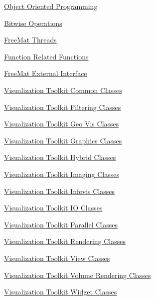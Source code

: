 \begin{DoxyItemize}
\item \hyperlink{sec_class}{Object Oriented Programming}  
\item \hyperlink{sec_binary}{Bitwise Operations}  
\item \hyperlink{sec_thread}{Free\-Mat Threads}  
\item \hyperlink{sec_function}{Function Related Functions}  
\item \hyperlink{sec_external}{Free\-Mat External Interface}  
\item \hyperlink{sec_vtkcommon}{Visualization Toolkit Common Classes}  
\item \hyperlink{sec_vtkfiltering}{Visualization Toolkit Filtering Classes}  
\item \hyperlink{sec_vtkgeovis}{Visualization Toolkit Geo Vis Classes}  
\item \hyperlink{sec_vtkgraphics}{Visualization Toolkit Graphics Classes}  
\item \hyperlink{sec_vtkhybrid}{Visualization Toolkit Hybrid Classes}  
\item \hyperlink{sec_vtkimaging}{Visualization Toolkit Imaging Classes}  
\item \hyperlink{sec_vtkinfovis}{Visualization Toolkit Infovis Classes}  
\item \hyperlink{sec_vtkio}{Visualization Toolkit I\-O Classes}  
\item \hyperlink{sec_vtkparallel}{Visualization Toolkit Parallel Classes}  
\item \hyperlink{sec_vtkrendering}{Visualization Toolkit Rendering Classes}  
\item \hyperlink{sec_vtkviews}{Visualization Toolkit View Classes}  
\item \hyperlink{sec_vtkvolumerendering}{Visualization Toolkit Volume Rendering Classes}  
\item \hyperlink{sec_vtkwidgets}{Visualization Toolkit Widget Classes}  
\end{DoxyItemize}